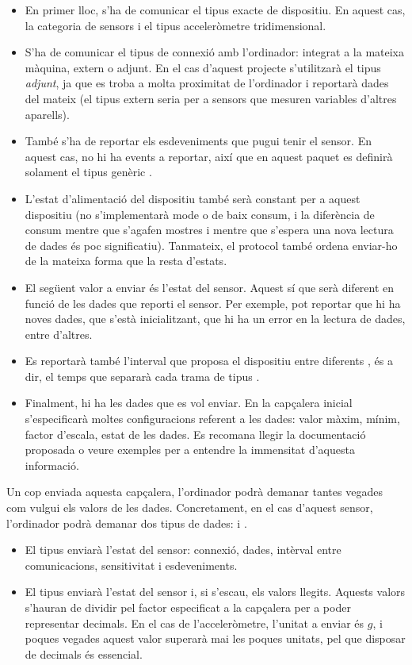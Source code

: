 \begin{itemize}
    \item En primer lloc, s'ha de comunicar el tipus exacte de dispositiu. En
    aquest cas, la categoria de sensors i el tipus acceleròmetre tridimensional.
    \item S'ha de comunicar el tipus de connexió amb l'ordinador: integrat a
    la mateixa màquina, extern o adjunt. En el cas d'aquest projecte s'utilitzarà
    el tipus \emph{adjunt}, ja que es troba a molta proximitat de l'ordinador
    i reportarà dades del mateix (el tipus extern seria per a sensors que
    mesuren variables d'altres aparells).
    \item També s'ha de reportar els esdeveniments que pugui tenir el sensor.
    En aquest cas, no hi ha events a reportar, així que en aquest paquet
    es definirà solament el tipus genèric .
    \item L'estat d'alimentació del dispositiu també serà constant per a
    aquest dispositiu (no s'implementarà mode  o de baix consum, i
    la diferència de consum mentre que s'agafen mostres i mentre que
    s'espera una nova lectura de dades és poc significatiu). Tanmateix, el
    protocol també ordena enviar-ho de la mateixa forma que la resta d'estats.
    \item El següent valor a enviar és l'estat del sensor. Aquest sí que serà
    diferent en funció de les dades que reporti el sensor. Per exemple, pot
    reportar que hi ha noves dades, que s'està inicialitzant, que hi ha un
    error en la lectura de dades, entre d'altres.
    \item Es reportarà també l'interval que proposa el dispositiu entre
    diferents , és a dir, el temps que separarà cada trama de
    tipus .
    \item Finalment, hi ha les dades que es vol enviar. En la capçalera inicial
    s'especificarà moltes configuracions referent a les dades: valor màxim,
    mínim, factor d'escala, estat de les dades. Es recomana llegir la
    documentació proposada o veure exemples per a entendre la immensitat
    d'aquesta informació.
\end{itemize}

Un cop enviada aquesta capçalera,
l'ordinador podrà demanar tantes vegades com vulgui els valors de les dades.
Concretament, en el cas d'aquest sensor, l'ordinador podrà demanar dos tipus
de dades:  i .

\begin{itemize}
    \item El tipus  enviarà l'estat del sensor: connexió, dades,
    intèrval entre comunicacions, sensitivitat i esdeveniments.
    \item El tipus  enviarà l'estat del sensor i, si s'escau, els
    valors llegits. Aquests valors s'hauran de dividir pel factor especificat
    a la capçalera per a poder representar decimals. En el cas de l'acceleròmetre,
    l'unitat a enviar és $g$, i poques vegades aquest valor superarà mai
    les poques unitats, pel que disposar de decimals és essencial.
\end{itemize}

